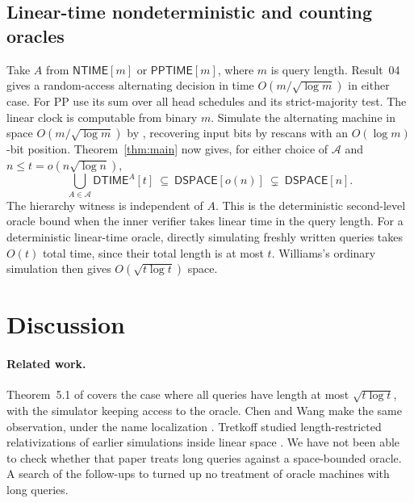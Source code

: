 \documentclass[11pt]{article}
\theoremstyle{remark}
\newcommand{\DTIME}{\mathsf{DTIME}}
\newcommand{\DSPACE}{\mathsf{DSPACE}}
\newcommand{\NTIME}{\mathsf{NTIME}}
\begin{document}
\subsection{Linear-time nondeterministic and counting oracles}
\label{sec:linear-oracles}
Take $A$ from $\NTIME[m]$ or $\mathsf{PPTIME}[m]$, where $m$ is
query length. Result~04~\cite{AS} gives a random-access alternating
decision in time $O(m/\sqrt{\log m})$ in either case. For PP use its
sum over all head schedules and its strict-majority test. The linear
clock is computable from binary $m$. Simulate the alternating machine
in space $O(m/\sqrt{\log m})$ by \cite{CKS}, recovering input bits
by rescans with an $O(\log m)$-bit position. Theorem~\ref{thm:main}
now gives, for either choice of $\mathcal A$ and $n\le t=o(n\sqrt{\log n})$,
\[
 \bigcup_{A\in\mathcal A}\DTIME^A[t]\ \subseteq\
 \DSPACE[o(n)]\ \subsetneq\ \DSPACE[n].
\]
The hierarchy witness is independent of $A$. This is the deterministic
second-level oracle bound when the inner verifier takes linear time
in the query length. For a deterministic linear-time oracle, directly
simulating freshly written queries takes $O(t)$ total time, since
their total length is at most $t$. Williams's ordinary simulation
then gives $O(\sqrt{t\log t})$ space.

\section{Discussion}
\paragraph{Related work.}
Theorem~5.1 of \cite{Wil25} covers the case where all queries
have length at most $\sqrt{t\log t}$, with the simulator keeping access to
the oracle. Chen and Wang make the same observation, under the name
localization \cite{CW26}. Tretkoff studied length-restricted
relativizations of earlier simulations inside linear space \cite{Tre86}.
We have not been able to check whether that paper treats long queries
against a space-bounded oracle. A search of the follow-ups to
\cite{Wil25} turned up no treatment of oracle machines with long queries.
\end{document}

